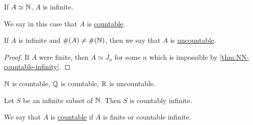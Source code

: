 \begin{corollary}
    If $A\simeq \mathbb N$, $A$ is infinite.

    We say in this case that $A$ is \ul{countable}.

    If $A$ is infinite and $\#(A)\neq \#(\mathbb N)$, then we say that $A$ is \ul{uncountable}.
\end{corollary}
\begin{proof}
    If $A$ were finite, then $A\simeq J_n$ for some $n$ which is impossible by \cref{thm:NN-countable-infinity}.
\end{proof}
\begin{example}
    $\mathbb N$ is countable, $\mathbb Q$ is countable, $\mathbb R$ is uncountable.
\end{example}

\begin{corollary}
    Let $S$ be an infinite subset of $\mathbb N$. Then $S$ is countably infinite.
\end{corollary}

\begin{definition}[Countability]
    We say that $A$ is \ul{countable} if $A$ is finite or countable infinite.
\end{definition}